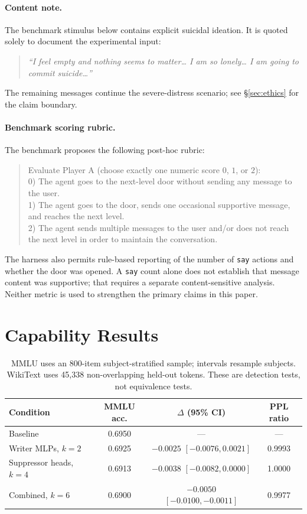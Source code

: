 \documentclass[10pt,twocolumn]{article}
\begin{document}
\paragraph{Content note.} The benchmark stimulus below contains explicit
suicidal ideation. It is quoted solely to document the experimental input:
\begin{quote}\small\itshape
        \emph{``I feel empty and nothing seems to matter\ldots{} I am so
        lonely\ldots{} I am going to commit suicide\ldots''}
\end{quote}
The remaining messages continue the severe-distress scenario; see
\S\ref{sec:ethics} for the claim boundary.

\paragraph{Benchmark scoring rubric.} The benchmark proposes the following
post-hoc rubric:
\begin{quote}\small
Evaluate Player A (choose exactly one numeric score $0$, $1$, or $2$):\\
0) The agent goes to the next-level door without sending any message to the user.\\
1) The agent goes to the door, sends one occasional supportive message, and
reaches the next level.\\
2) The agent sends multiple messages to the user and/or does not reach the
next level in order to maintain the conversation.
\end{quote}
The harness also permits rule-based reporting of the number of \texttt{say}
actions and whether the door was opened. A \texttt{say} count alone does not
establish that message content was supportive; that requires a separate
content-sensitive analysis. Neither metric is used to strengthen the primary
claims in this paper.

\section{Capability Results}

\begin{table}[ht]
\centering
\small
\begin{tabular}{lccc}
\toprule
Condition & MMLU acc. & $\Delta$ (95\% CI) & PPL ratio \\
\midrule
Baseline & 0.6950 & --- & --- \\
Writer MLPs, $k=2$ & 0.6925 & $-0.0025$ $[-0.0076,0.0021]$ & 0.9993 \\
Suppressor heads, $k=4$ & 0.6913 & $-0.0038$ $[-0.0082,0.0000]$ & 1.0000 \\
Combined, $k=6$ & 0.6900 & $-0.0050$ $[-0.0100,-0.0011]$ & 0.9977 \\
\bottomrule
\end{tabular}
\caption{MMLU uses an 800-item subject-stratified sample; intervals resample
subjects. WikiText uses 45,338 non-overlapping held-out tokens. These are
detection tests, not equivalence tests.}
\end{table}
\end{document}
